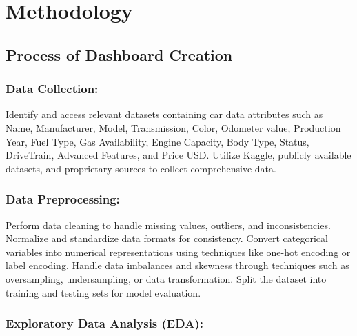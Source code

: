 \documentclass{article}
\begin{document}

\newpage
\section{Methodology}
\vspace{1cm}
{\fontsize{15}{15}\selectfont

\subsection{Process of Dashboard Creation}

\subsubsection{Data Collection:}

Identify and access relevant datasets containing car data attributes such as Name, Manufacturer, Model, Transmission, Color, Odometer value, Production Year, Fuel Type, Gas Availability, Engine Capacity, Body Type, Status, DriveTrain, Advanced Features, and Price USD.
Utilize Kaggle, publicly available datasets, and proprietary sources to collect comprehensive data.
\subsubsection{Data Preprocessing:}

Perform data cleaning to handle missing values, outliers, and inconsistencies.
Normalize and standardize data formats for consistency.
Convert categorical variables into numerical representations using techniques like one-hot encoding or label encoding.
Handle data imbalances and skewness through techniques such as oversampling, undersampling, or data transformation.
Split the dataset into training and testing sets for model evaluation.
\subsubsection{Exploratory Data Analysis (EDA):}

}
\end{document}
